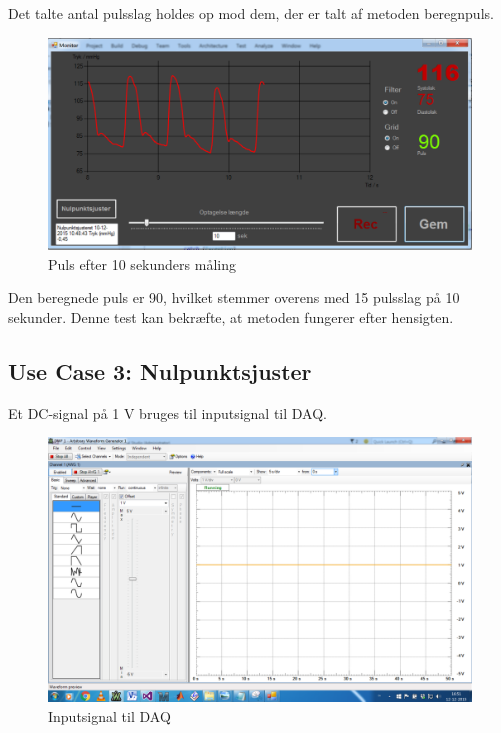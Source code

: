 Det talte antal pulsslag holdes op mod dem, der er talt af metoden beregnpuls.

\begin{figure}[H]
	\centering
	\includegraphics[width=1\textwidth]{Figurer/Pulstest_monitor}
	\caption{Puls efter 10 sekunders måling}
\end{figure}


Den beregnede puls er 90, hvilket stemmer overens med 15 pulsslag på 10 sekunder. Denne test kan bekræfte, at metoden fungerer efter hensigten.





\subsection{Use Case 3: Nulpunktsjuster}

Et DC-signal på 1 V bruges til inputsignal til DAQ.
\begin{figure}[H]
	\centering
	\includegraphics[width=1\textwidth]{Figurer/Test_Nul_1}
	\caption{Inputsignal til DAQ}
\end{figure}

